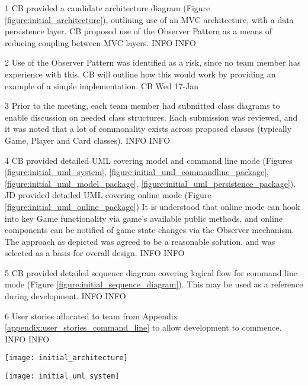\begin{momitems}
	\momitem
	{1}
	{CB provided a candidate architecture diagram (Figure \ref{figure:initial_architecture}), outlining use of an MVC architecture, with a data persistence layer. 
	CB proposed use of the Observer Pattern as a means of reducing coupling between MVC layers.}
	{INFO}
	{INFO}

	\momitem
	{2}
	{Use of the Observer Pattern was identified as a risk, since no team member has experience with this. 
	CB will outline how this would work by providing an example of a simple implementation.}
	{CB}
	{Wed 17-Jan}

	\momitem
	{3}
	{Prior to the meeting, each team member had submitted class diagrams to enable discussion on needed class structures. 
	Each submission was reviewed, and it was noted that a lot of commonality exists across proposed classes (typically Game, Player and Card classes).}
	{INFO}
	{INFO}

	\momitem
	{4}
	{CB provided detailed UML covering model and command line mode (Figures \ref{figure:initial_uml_system}, \ref{figure:initial_uml_commandline_package}, \ref{figure:initial_uml_model_package}, \ref{figure:initial_uml_persistence_package}).
	JD provided detailed UML covering online mode (Figure \ref{figure:initial_uml_online_package})
	It is understood that online mode can hook into key Game functionality via game's available public methods, and online components can be notified of game state changes via the Observer mechanism. 
	The approach as depicted was agreed to be a reasonable solution, and was selected as a basis for overall design.}
	{INFO}
	{INFO}

	\momitem
	{5}
	{CB provided detailed sequence diagram covering logical flow for command line mode (Figure \ref{figure:initial_sequence_diagram}). 
	This may be used as a reference during development.}
	{INFO}
	{INFO}

	\momitem
	{6}
	{User stories allocated to team from Appendix \ref{appendix:user_stories_command_line} to allow development to commence.}
	{INFO}
	{INFO}
\end{momitems}

\begin{center}
	\texttt{[image: initial\_architecture]}
	\label{figure:initial_architecture}
\end{center}

\begin{center}
	\texttt{[image: initial\_uml\_system]}
	\label{figure:initial_uml_system}
\end{center}

